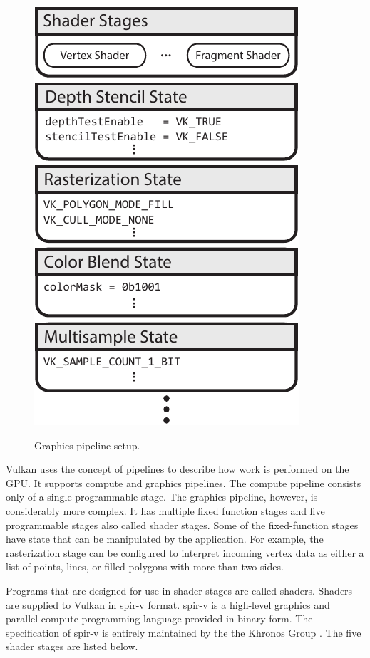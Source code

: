     \begin{figure}
      \caption{Graphics pipeline setup.}
      \centering
      \includegraphics{Main/Images/GraphicsPipeline}
      \label{fig:GraphicsPipeline}
    \end{figure}


    Vulkan uses the concept of pipelines to describe how work is performed on the GPU. It supports compute and graphics pipelines. The compute pipeline consists only of a single programmable stage. The graphics pipeline, however, is considerably more complex. It has multiple fixed function stages and five programmable stages also called shader stages. Some of the fixed-function stages have state that can be manipulated by the application. For example, the rasterization stage can be configured to interpret incoming vertex data as either a list of points, lines, or filled polygons with more than two sides.

    Programs that are designed for use in shader stages are called shaders. Shaders are supplied to Vulkan in \acrfull{spir-v} format. \acrshort{spir-v} is a high-level graphics and parallel compute programming language provided in binary form. The specification of \acrshort{spir-v} is entirely maintained by the the Khronos Group \cite{spirvspecprov}. The five shader stages are listed below.

